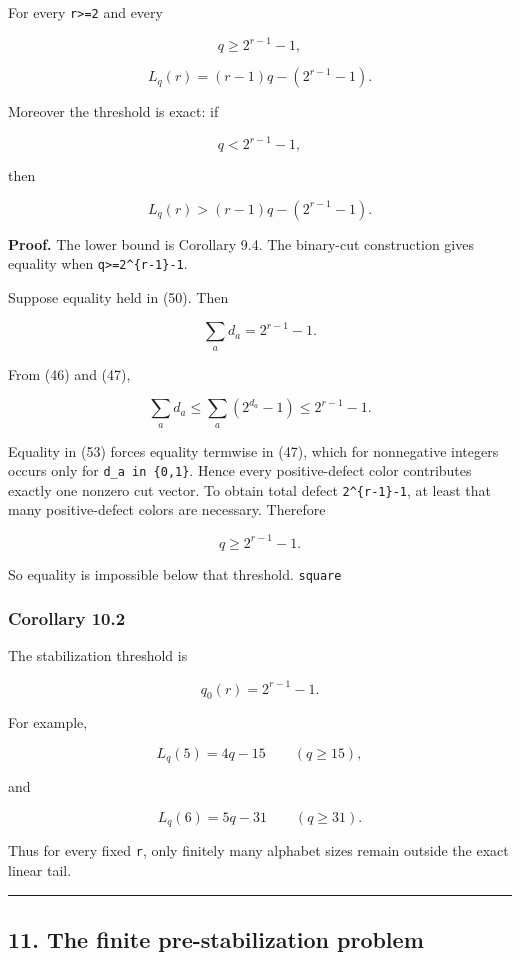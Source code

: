 For every \texttt{r\textgreater{}=2} and every

\[
q\ge2^{r-1}-1,
\]

\[
\boxed{
L_q(r)=(r-1)q-(2^{r-1}-1).
}
\tag{51}
\]

Moreover the threshold is exact: if

\[
q<2^{r-1}-1,
\]

then

\[
L_q(r)>(r-1)q-(2^{r-1}-1).
\tag{52}
\]

\textbf{Proof.} The lower bound is Corollary 9.4. The binary-cut
construction gives equality when
\texttt{q\textgreater{}=2\^{}\{r-1\}-1}.

Suppose equality held in (50). Then

\[
\sum_a d_a=2^{r-1}-1.
\tag{53}
\]

From (46) and (47),

\[
\sum_a d_a
\le
\sum_a(2^{d_a}-1)
\le
2^{r-1}-1.
\tag{54}
\]

Equality in (53) forces equality termwise in (47), which for nonnegative
integers occurs only for \texttt{d\_a\ in\ \{0,1\}}. Hence every
positive-defect color contributes exactly one nonzero cut vector. To
obtain total defect \texttt{2\^{}\{r-1\}-1}, at least that many
positive-defect colors are necessary. Therefore

\[
q\ge2^{r-1}-1.
\]

So equality is impossible below that threshold. \texttt{square}

\hypertarget{corollary-10.2}{%
\subsubsection{Corollary 10.2}\label{corollary-10.2}}

The stabilization threshold is

\[
\boxed{q_0(r)=2^{r-1}-1.}
\tag{55}
\]

For example,

\[
L_q(5)=4q-15\qquad(q\ge15),
\tag{56}
\]

and

\[
L_q(6)=5q-31\qquad(q\ge31).
\tag{57}
\]

Thus for every fixed \texttt{r}, only finitely many alphabet sizes
remain outside the exact linear tail.

\begin{center}\rule{0.5\linewidth}{0.5pt}\end{center}

\hypertarget{the-finite-pre-stabilization-problem}{%
\subsection{11. The finite pre-stabilization
problem}\label{the-finite-pre-stabilization-problem}}

